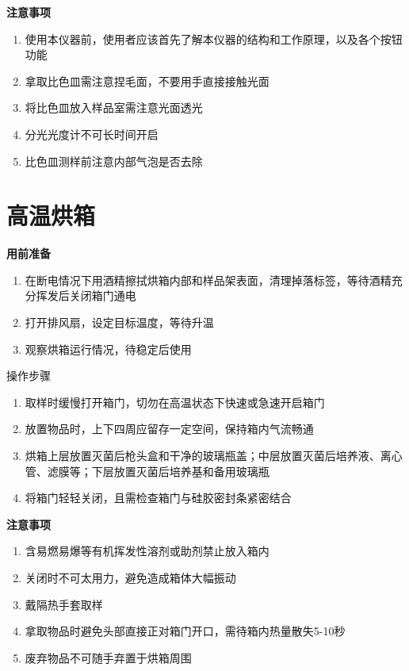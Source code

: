 \documentclass[
]{book}
\providecommand{\tightlist}{%
  \setlength{\itemsep}{0pt}\setlength{\parskip}{0pt}}
\begin{document}
\textbf{注意事项}

\begin{enumerate}
\def\labelenumi{\arabic{enumi}.}
\tightlist
\item
  使用本仪器前，使用者应该首先了解本仪器的结构和工作原理，以及各个按钮功能
\item
  拿取比色皿需注意捏毛面，不要用手直接接触光面
\item
  将比色皿放入样品室需注意光面透光
\item
  分光光度计不可长时间开启
\item
  比色皿测样前注意内部气泡是否去除
\end{enumerate}

\hypertarget{ux9ad8ux6e29ux70d8ux7bb1}{%
\section{高温烘箱}\label{ux9ad8ux6e29ux70d8ux7bb1}}

\textbf{用前准备}

\begin{enumerate}
\def\labelenumi{\arabic{enumi}.}
\tightlist
\item
  在断电情况下用酒精擦拭烘箱内部和样品架表面，清理掉落标签，等待酒精充分挥发后关闭箱门通电
\item
  打开排风扇，设定目标温度，等待升温
\item
  观察烘箱运行情况，待稳定后使用
\end{enumerate}

操作步骤

\begin{enumerate}
\def\labelenumi{\arabic{enumi}.}
\tightlist
\item
  取样时缓慢打开箱门，切勿在高温状态下快速或急速开启箱门
\item
  放置物品时，上下四周应留存一定空间，保持箱内气流畅通
\item
  烘箱上层放置灭菌后枪头盒和干净的玻璃瓶盖；中层放置灭菌后培养液、离心管、滤膜等；下层放置灭菌后培养基和备用玻璃瓶
\item
  将箱门轻轻关闭，且需检查箱门与硅胶密封条紧密结合
\end{enumerate}

\textbf{注意事项}

\begin{enumerate}
\def\labelenumi{\arabic{enumi}.}
\tightlist
\item
  含易燃易爆等有机挥发性溶剂或助剂禁止放入箱内
\item
  关闭时不可太用力，避免造成箱体大幅振动
\item
  戴隔热手套取样
\item
  拿取物品时避免头部直接正对箱门开口，需待箱内热量散失5-10秒
\item
  废弃物品不可随手弃置于烘箱周围
\end{enumerate}
\end{document}
